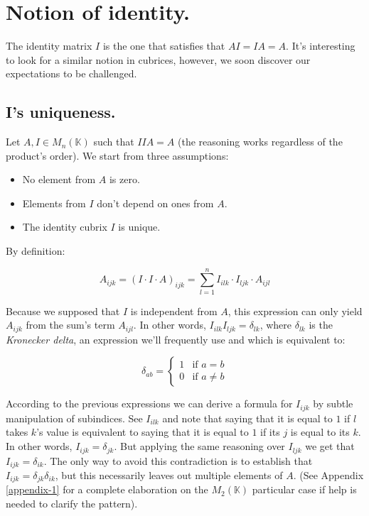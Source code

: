 \section{Notion of identity.} \label{identity}

The identity matrix $I$ is the one that satisfies that $AI = IA = A$. It's interesting to look for a similar notion in cubrices, however, we soon discover our expectations to be challenged.

\subsection{I's uniqueness.} \label{identity-unique}

Let $A, I \in M_{n} (\mathbb{K})$ such that $IIA = A$ (the reasoning works regardless of the product's order). We start from three assumptions:

\begin{itemize}
	\item No element from $A$ is zero.
	\item Elements from $I$ don't depend on ones from $A$.
	\item The identity cubrix $I$ is unique.
\end{itemize}

By definition:

$$A_{ijk} = (I \cdot I \cdot A)_{ijk} = \sum\limits_{l=1}^{n} I_{ilk} \cdot I_{ljk} \cdot A_{ijl}$$

Because we supposed that $I$ is independent from $A$, this expression can only yield $A_{ijk}$ from the sum's term $A_{ijl}$. In other words, $I_{ilk} I_{ljk} = \delta_{lk}$, where $\delta_{lk}$ is the \textit{Kronecker delta}, an expression we'll frequently use and which is equivalent to:

\begin{equation}
	\delta_{ab} =
	\begin{cases}
		1 & \text{if } a = b \\
		0 & \text{if } a \neq b
	\end{cases}
\end{equation}

According to the previous expressions we can derive a formula for $I_{ijk}$ by subtle manipulation of subindices. See $I_{ilk}$ and note that saying that it is equal to $1$ if $l$ takes $k$'s value is equivalent to saying that it is equal to $1$ if its $j$ is equal to its $k$. In other words, $I_{ijk} = \delta_{jk}$. But applying the same reasoning over $I_{ljk}$ we get that $I_{ijk} = \delta_{ik}$. The only way to avoid this contradiction is to establish that $I_{ijk} = \delta_{jk} \delta_{ik}$, but this necessarily leaves out multiple elements of $A$. (See Appendix \ref{appendix-1} for a complete elaboration on the $M_2 (\mathbb{K})$ particular case if help is needed to clarify the pattern).

